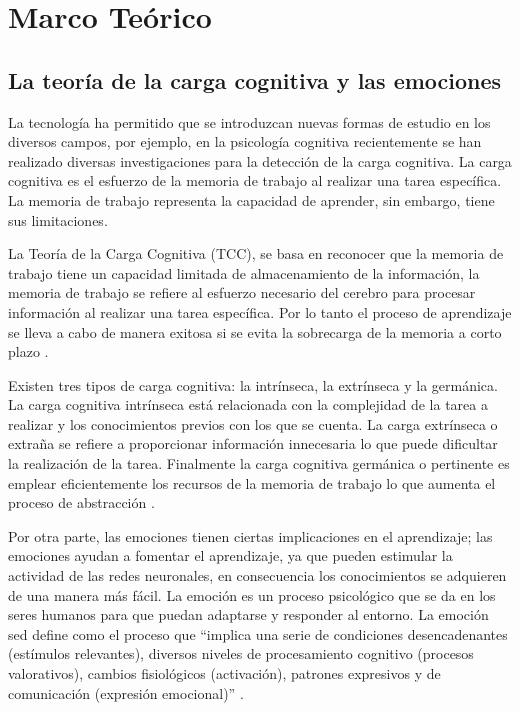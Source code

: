 
\chapter{Marco Teórico}
\section{La teoría de la carga cognitiva y las emociones}

La tecnología ha permitido que se introduzcan nuevas formas de estudio en los diversos campos, por ejemplo, en la psicología cognitiva recientemente se han realizado diversas investigaciones para la detección de la carga cognitiva.  La carga cognitiva es el esfuerzo de la memoria de trabajo al realizar una tarea específica. La memoria de trabajo representa la capacidad de aprender, sin embargo, tiene sus limitaciones. 

La Teoría de la Carga Cognitiva (TCC), se basa en reconocer que la memoria de trabajo tiene un capacidad limitada de almacenamiento de la información, la memoria de trabajo se refiere al esfuerzo necesario del cerebro para procesar información al realizar una tarea específica. Por lo tanto el proceso de aprendizaje se lleva a cabo de manera exitosa si se evita la sobrecarga de la memoria a corto plazo \cite{sweller}.

Existen tres tipos de carga cognitiva: la intrínseca, la extrínseca y la germánica. La carga cognitiva intrínseca está relacionada con la complejidad de la tarea a realizar y los conocimientos previos con los que se cuenta. La carga extrínseca o extraña se refiere a proporcionar información innecesaria lo que puede dificultar la realización de la tarea. Finalmente la carga cognitiva germánica o pertinente es emplear eficientemente los recursos de la memoria de trabajo lo que aumenta el proceso de abstracción \cite{cardenas}. 



Por otra parte, las emociones tienen ciertas implicaciones en el aprendizaje; las emociones ayudan a fomentar el aprendizaje, ya que pueden estimular la actividad de las redes neuronales, en consecuencia los conocimientos se adquieren de una manera más fácil.  La emoción es un proceso psicológico que se da en los seres humanos para que puedan adaptarse y responder al entorno.   
La emoción sed define como el proceso que ``implica una serie de condiciones desencadenantes (estímulos relevantes), diversos niveles de procesamiento cognitivo (procesos valorativos), cambios fisiológicos (activación), patrones expresivos y de comunicación (expresión emocional)'' \cite{garcia}.

